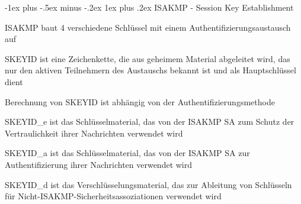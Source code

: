\documentclass[a4paper]{article}
\makeatletter
\renewcommand{\subsubsection}{\@startsection{subsubsection}{3}{0mm}%
 {-1ex plus -.5ex minus -.2ex}%
 {1ex plus .2ex}%
 {\normalfont\small\bfseries}}
\makeatother
\begin{document}
\begin{multicols}{3}
      \subsubsection{ISAKMP - Session Key Establishment}
      \begin{itemize*}
            \item ISAKMP baut 4 verschiedene Schlüssel mit einem Authentifizierungsaustausch auf
            \item SKEYID ist eine Zeichenkette, die aus geheimem Material abgeleitet wird, das nur den aktiven Teilnehmern des Austauschs bekannt ist und als Hauptschlüssel dient
            \item Berechnung von SKEYID ist abhängig von der Authentifizierungsmethode
            \item SKEYID\_e ist das Schlüsselmaterial, das von der ISAKMP SA zum Schutz der Vertraulichkeit ihrer Nachrichten verwendet wird
            \item SKEYID\_a ist das Schlüsselmaterial, das von der ISAKMP SA zur Authentifizierung ihrer Nachrichten verwendet wird
            \item SKEYID\_d ist das Verschlüsselungsmaterial, das zur Ableitung von Schlüsseln für Nicht-ISAKMP-Sicherheitsassoziationen verwendet wird
      \end{itemize*}


\end{multicols}
\end{document}

